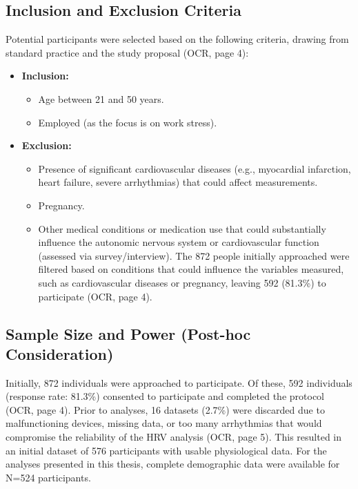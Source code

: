 \documentclass[11pt, a4paper]{report}
\newcommand{\jsoncite}[1]{\href{run:./data/#1.json}{\texttt{\detokenize{#1.json}}}}
\begin{document}
\subsection{Inclusion and Exclusion Criteria}
\label{subsec:inclusion_exclusion_method} %
Potential participants were selected based on the following criteria, drawing from standard practice and the study proposal \cite{ThesisTempPDF} (OCR, page 4):
\begin{itemize}
    \item \textbf{Inclusion:}
        \begin{itemize}
            \item Age between 21 and 50 years.
            \item Employed (as the focus is on work stress).
        \end{itemize}
    \item \textbf{Exclusion:}
        \begin{itemize}
            \item Presence of significant cardiovascular diseases (e.g., myocardial infarction, heart failure, severe arrhythmias) that could affect measurements.
            \item Pregnancy.
            \item Other medical conditions or medication use that could substantially influence the autonomic nervous system or cardiovascular function (assessed via survey/interview). The 872 people initially approached were filtered based on conditions that could influence the variables measured, such as cardiovascular diseases or pregnancy, leaving 592 (81.3\%) to participate \cite{ThesisTempPDF} (OCR, page 4).
        \end{itemize}
\end{itemize}

\subsection{Sample Size and Power (Post-hoc Consideration)}
\label{subsec:sample_size_method} %
Initially, 872 individuals were approached to participate. Of these, 592 individuals (response rate: 81.3\%) consented to participate and completed the protocol \cite{ThesisTempPDF} (OCR, page 4). Prior to analyses, 16 datasets (2.7\%) were discarded due to malfunctioning devices, missing data, or too many arrhythmias that would compromise the reliability of the HRV analysis \cite{ThesisTempPDF} (OCR, page 5). This resulted in an initial dataset of 576 participants with usable physiological data. For the analyses presented in this thesis, complete demographic data were available for N=524 participants.
\end{document}
